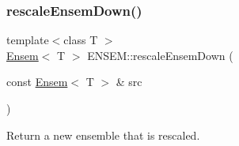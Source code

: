 \subsubsection{\texorpdfstring{rescaleEnsemDown()}{rescaleEnsemDown()}}
{\footnotesize\ttfamily template$<$class T $>$ \\
\mbox{\hyperlink{classENSEM_1_1Ensem}{Ensem}}$<$ T $>$ E\+N\+S\+E\+M\+::rescale\+Ensem\+Down (\begin{DoxyParamCaption}\item[{const \mbox{\hyperlink{classENSEM_1_1Ensem}{Ensem}}$<$ T $>$ \&}]{src }\end{DoxyParamCaption})\hspace{0.3cm}{\ttfamily [inline]}}



Return a new ensemble that is rescaled. 

